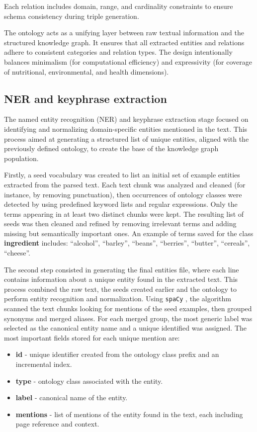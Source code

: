 Each relation includes domain, range, and cardinality constraints to ensure schema consistency during triple generation.

The ontology acts as a unifying layer between raw textual information and the structured knowledge graph. It ensures that all extracted entities and relations adhere to consistent categories and relation types. The design intentionally balances minimalism (for computational efficiency) and expressivity (for coverage of nutritional, environmental, and health dimensions).


\subsection{NER and keyphrase extraction}
The named entity recognition (NER) \cite{NER} and keyphrase extraction stage focused on identifying and normalizing domain-specific entities mentioned in the text. This process aimed at generating a structured list of unique entities, aligned with the previously defined ontology, to create the base of the knowledge graph population. 

Firstly, a seed vocabulary was created to list an initial set of example entities extracted from the parsed text. Each text chunk was analyzed and cleaned (for instance, by removing punctuation), then occurrences of ontology classes were detected by using predefined keyword lists and regular expressions. Only the terms appearing in at least two distinct chunks were kept. The resulting list of seeds was then cleaned and refined by removing irrelevant terms and adding missing but semantically important ones. An example of terms saved for the class \textbf{ingredient} includes: “alcohol”, “barley”, “beans”, “berries”, “butter”, “cereals”, “cheese”.

The second step consisted in generating the final entities file, where each line contains information about a unique entity found in the extracted text. This process combined the raw text, the seeds created earlier and the ontology to perform entity recognition and normalization. Using \texttt{spaCy} \cite{spacy}, the algorithm scanned the text chunks looking for mentions of the seed examples, then grouped synonyms and merged aliases. For each merged group, the most generic label was selected as the canonical entity name and a unique identified was assigned. The most important fields stored for each unique mention are:
\begin{itemize}
    \item\textbf{id} - unique identifier created from the ontology class prefix and an incremental index.
    \item \textbf{type} - ontology class associated with the entity.
    \item \textbf{label} - canonical name of the entity.
    \item \textbf{mentions} - list of mentions of the entity found in the text, each including page reference and context.
\end{itemize}

